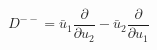 \begin{equation}
D^{--} =  \bar{u}_{1}\frac{\partial}{\partial u_{2}} -\bar{u}_{2}\frac{\partial}{\partial
u_{1}}
\end{equation}

